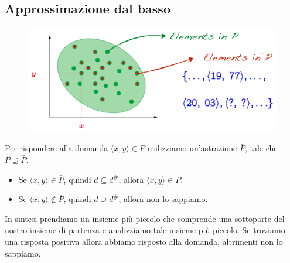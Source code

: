\subsection{Approssimazione dal basso}
\begin{figure}[H]
  \centering
  \includegraphics[scale=0.5]{img/approx.png}
\end{figure}
Per rispondere alla domanda $\langle x, y \rangle \in P$ utilizziamo un'astrazione $\bar{P}$,
tale che $P \supseteq \bar{P}$.
\begin{itemize}
  \item Se $\langle x, y \rangle \in \bar{P}$, quindi $d \subseteq d^\#$, allora $\langle x, y \rangle \in P$.
  \item Se $\langle x, y \rangle \notin \bar{P}$, quindi $d \supseteq d^\#$, allora non lo sappiamo.
\end{itemize}
In sintesi prendiamo un insieme più piccolo che comprende una sottoparte del nostro insieme di partenza e
analizziamo tale insieme più piccolo. Se troviamo una risposta positiva allora abbiamo risposto alla domanda,
altrimenti non lo sappiamo.
